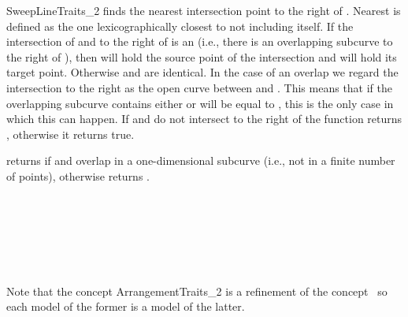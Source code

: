 \begin{ccRefConcept}{SweepLineTraits_2}
{finds the
nearest intersection point to the right of . Nearest is defined as the
one lexicographically closest to  not including  itself.
If the intersection of  and  to the
right of  is an  (i.e., there is an overlapping subcurve
to the right of ),
then  will hold the source point of the intersection and
 will hold its target point. Otherwise  and  are
identical. In the case of an overlap we regard the intersection
to the right as the open curve between  and . This means that
if the overlapping subcurve contains  either  or  will
be equal to , this is the only case in which this can happen.
If  and  do not intersect to the right of 
the function returns , otherwise it returns true.
}


{returns  if  and  overlap
in a one-dimensional subcurve (i.e., not in a finite number
of points), otherwise returns
.}

\ccHasModels
  \\
  \\
  \\
   \\
   \\

  Note that the concept ArrangementTraits\_2 is a refinement of the 
  concept \ccRefName\ so each model of the former is a model of the latter.

\ccSeeAlso

 \\
 \\


\end{ccRefConcept}
